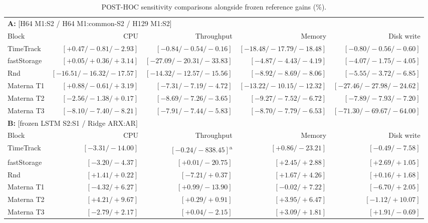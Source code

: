 \begin{table}[t]
  \caption{POST-HOC sensitivity comparisons alongside frozen reference gains (\%).}
  \label{tab:posthoc-controls}
  \centering
  \small
  \setlength{\tabcolsep}{2pt}
  \renewcommand{\arraystretch}{1.12}
  \begin{tabular*}{\textwidth}{@{\extracolsep{\fill}}lrrrr@{}}
    \toprule
    \multicolumn{5}{l}{\textbf{A:} [H64 M1:S2 / H64 M1:common-S2 / H129 M1:S2]} \\
    Block & CPU & Throughput & Memory & Disk write \\
    \midrule
    TimeTrack & $[+0.47/-0.81/-2.93]$ & $[-0.84/-0.54/-0.16]$ & $[-18.48/-17.79/-18.48]$ & $[-0.80/-0.56/-0.60]$ \\
    fastStorage & $[+0.05/+0.36/+3.14]$ & $[-27.09/-20.31/-33.83]$ & $[-4.87/-4.43/-4.19]$ & $[-4.07/-1.75/-4.05]$ \\
    Rnd & $[-16.51/-16.32/-17.57]$ & $[-14.32/-12.57/-15.56]$ & $[-8.92/-8.69/-8.06]$ & $[-5.55/-3.72/-6.85]$ \\
    Materna T1 & $[+0.88/-0.61/+3.19]$ & $[-7.31/-7.19/-4.72]$ & $[-13.22/-10.15/-12.32]$ & $[-27.46/-27.98/-24.62]$ \\
    Materna T2 & $[-2.56/-1.38/+0.17]$ & $[-8.69/-7.26/-3.65]$ & $[-9.27/-7.52/-6.72]$ & $[-7.89/-7.93/-7.20]$ \\
    Materna T3 & $[-8.10/-7.40/-8.21]$ & $[-7.91/-7.44/-5.83]$ & $[-8.70/-7.79/-6.53]$ & $[-71.30/-69.67/-64.00]$ \\
    \midrule
    \multicolumn{5}{l}{\textbf{B:} [frozen LSTM S2:S1 / Ridge ARX:AR]} \\
    Block & CPU & Throughput & Memory & Disk write \\
    \midrule
    TimeTrack & $[-3.31/-14.00]$ & $[-0.24/-838.45]$\textsuperscript{a} & $[+0.86/-23.21]$ & $[-0.49/-7.58]$ \\
    fastStorage & $[-3.20/-4.37]$ & $[+0.01/-20.75]$ & $[+2.45/+2.88]$ & $[+2.69/+1.05]$ \\
    Rnd & $[+1.41/+0.22]$ & $[-7.21/+0.37]$ & $[+1.67/+4.26]$ & $[+0.16/+1.68]$ \\
    Materna T1 & $[-4.32/+6.27]$ & $[+0.99/-13.90]$ & $[-0.02/+7.22]$ & $[-6.70/+2.05]$ \\
    Materna T2 & $[+4.21/+9.67]$ & $[+0.29/+0.91]$ & $[+3.95/+6.47]$ & $[-1.12/+10.07]$ \\
    Materna T3 & $[-2.79/+2.17]$ & $[+0.04/-2.15]$ & $[+3.09/+1.81]$ & $[+1.91/-0.69]$ \\

\end{tabular*}
\end{table}
